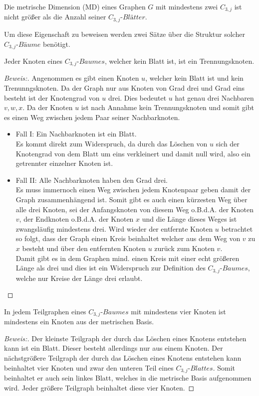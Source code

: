 \begin{lem}
Die metrische Dimension (MD) eines Graphen $G$ mit mindestens zwei $C_{3,j}$ ist nicht größer als die Anzahl seiner $C_{3,j}$-$Blätter$. 
\end{lem}
Um diese Eigenschaft zu beweisen werden zwei Sätze über die Struktur solcher $C_{3,j}$-$Bäume$ benötigt.
\begin{lem}
Jeder Knoten eines $C_{3,j}$-$Baumes$, welcher kein Blatt ist, ist ein Trennungsknoten.
\end{lem}
\begin{proof}[Beweis:]
Angenommen es gibt einen Knoten $u$, welcher kein Blatt ist und kein Trenunngsknoten. Da der Graph nur aus Knoten von Grad drei und Grad eins besteht ist der Knotengrad von $u$ drei. Dies bedeutet $u$ hat genau drei Nachbaren $v,w,x$. Da
der Knoten $u$ ist nach Annahme kein Trennungsknoten und somit gibt es einen Weg zwischen jedem Paar seiner Nachbarknoten.\begin{itemize}
\item Fall I: Ein Nachbarknoten ist ein Blatt.\\ Es kommt direkt zum Widerspruch, da durch das Löschen von $u$ sich der Knotengrad von dem Blatt um eins verkleinert und damit null wird, also ein getrennter einzelner Knoten ist.\item
Fall II: Alle Nachbarknoten haben den Grad drei.\\
Es muss immernoch einen Weg zwischen jedem Knotenpaar geben damit der Graph zusammenhängend ist. Somit gibt es auch einen kürzesten Weg über alle drei Knoten, sei der Anfangsknoten von diesem Weg o.B.d.A. der Knoten $v$, der Endknoten o.B.d.A. der Knoten $x$ und die Länge dieses Weges ist zwangsläufig mindestens drei. Wird wieder der entfernte Knoten $u$ betrachtet so folgt, dass der Graph einen Kreis beinhaltet welcher aus dem Weg von $v$ zu $x$ besteht und über den entfernten Knoten $u$ zurück zum Knoten $v$.\\
Damit gibt es in dem Graphen mind. einen Kreis mit einer echt größeren Länge als drei und dies ist ein Widerspruch zur Definition des $C_{3,j}$-$Baumes$, welche nur Kreise der Länge drei erlaubt.
\end{itemize}
\end{proof}
\begin{lem}
In jedem Teilgraphen eines $C_{3,j}$-$Baumes$ mit mindestens vier Knoten ist mindestens ein Knoten aus der metrischen Basis.
\end{lem}
\begin{proof}[Beweis:]
Der kleinste Teilgraph der durch das Löschen eines Knotens entstehen kann ist ein Blatt. Dieser besteht allerdings nur aus einem Knoten. Der nächstgrößere Teilgraph der durch das Löschen eines Knotens entstehen kann beinhaltet vier Knoten und zwar den unteren Teil eines $C_{3,j}$-$Blattes$. Somit beinhaltet er auch sein linkes Blatt, welches in die metrische Basis aufgenommen wird. Jeder größere Teilgraph beinhaltet diese vier Knoten. %
\end{proof}

